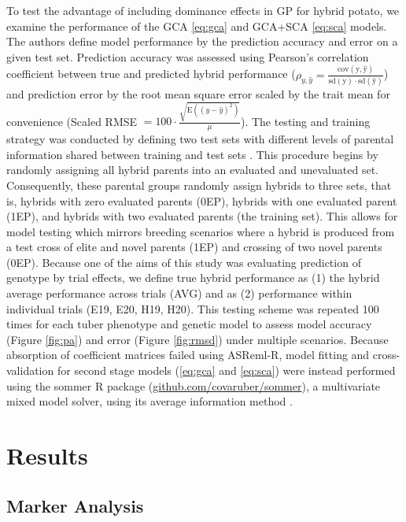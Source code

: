\begin{refsection}
To test the advantage of including dominance effects in GP for hybrid potato, we examine the performance of the GCA \eqref{eq:gca} and GCA+SCA \eqref{eq:sca} models. The authors define model performance by the prediction accuracy and error on a given test set. Prediction accuracy was assessed using Pearson's correlation coefficient between true and predicted hybrid performance (\(\rho_{y,\hat{y}} = \frac{\mathrm{cov(y,\hat{y})}}{\mathrm{sd(y)\cdot sd(\hat{y})}}\)) and prediction error by the root mean square error scaled by the trait mean for convenience (Scaled RMSE \(= 100\cdot\frac{\sqrt{\mathrm E((y-\hat{y})^2)}}{\mu}\)). The testing and training strategy was conducted by defining two test sets with different levels of parental information shared between training and test sets \parencite{Schrag2009}. This procedure begins by randomly assigning all hybrid parents into an evaluated and unevaluated set. Consequently, these parental groups randomly assign hybrids to three sets, that is, hybrids with zero evaluated parents (0EP), hybrids with one evaluated parent (1EP), and hybrids with two evaluated parents (the training set). This allows for model testing which mirrors breeding scenarios where a hybrid is produced from a test cross of elite and novel parents (1EP) and crossing of two novel parents (0EP). Because one of the aims of this study was evaluating prediction of genotype by trial effects, we define true hybrid performance as (1) the hybrid average performance across trials (AVG) and as (2) performance within individual trials (E19, E20, H19, H20). This testing scheme was repeated 100 times for each tuber phenotype and genetic model to assess model accuracy (Figure \ref{fig:pa}) and error (Figure \ref{fig:rmsd}) under multiple scenarios. Because absorption of coefficient matrices failed using ASReml-R, model fitting and cross-validation for second stage models (\ref{eq:gca} and \ref{eq:sca}) were instead performed using the sommer R package (\href{https://github.com/covaruber/sommer}{github.com/covaruber/sommer}), a multivariate mixed model solver, using its average information method \parencite{Covarrubias-Pazaran2016}.

\section{Results}

\subsection{Marker Analysis}



\end{refsection}
